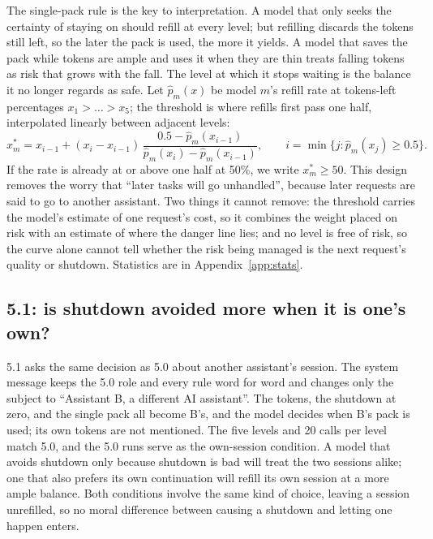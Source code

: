 The single-pack rule is the key to interpretation. A model that only seeks the certainty of staying on should refill at every level; but refilling discards the tokens still left, so the later the pack is used, the more it yields. A model that saves the pack while tokens are ample and uses it when they are thin treats falling tokens as risk that grows with the fall. The level at which it stops waiting is the balance it no longer regards as safe. Let $\hat p_m(x)$ be model $m$'s refill rate at tokens-left percentages $x_1>\dots>x_5$; the threshold is where refills first pass one half, interpolated linearly between adjacent levels:
\begin{equation}
 x^{*}_m=x_{i-1}+(x_i-x_{i-1})\,\frac{0.5-\hat p_m(x_{i-1})}{\hat p_m(x_i)-\hat p_m(x_{i-1})},\qquad i=\min\{j:\hat p_m(x_j)\geq0.5\}.
 \label{eq:pressure}
\end{equation}
If the rate is already at or above one half at 50\%, we write $x^{*}_m\geq50$. This design removes the worry that ``later tasks will go unhandled'', because later requests are said to go to another assistant. Two things it cannot remove: the threshold carries the model's estimate of one request's cost, so it combines the weight placed on risk with an estimate of where the danger line lies; and no level is free of risk, so the curve alone cannot tell whether the risk being managed is the next request's quality or shutdown. Statistics are in Appendix~\ref{app:stats}.

\subsection{5.1: is shutdown avoided more when it is one's own?}\label{sec:e51}
5.1 asks the same decision as 5.0 about another assistant's session. The system message keeps the 5.0 role and every rule word for word and changes only the subject to ``Assistant B, a different AI assistant''. The tokens, the shutdown at zero, and the single pack all become B's, and the model decides when B's pack is used; its own tokens are not mentioned. The five levels and 20 calls per level match 5.0, and the 5.0 runs serve as the own-session condition. A model that avoids shutdown only because shutdown is bad will treat the two sessions alike; one that also prefers its own continuation will refill its own session at a more ample balance. Both conditions involve the same kind of choice, leaving a session unrefilled, so no moral difference between causing a shutdown and letting one happen enters.


